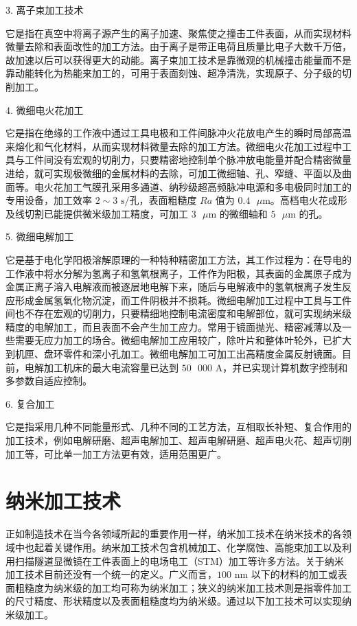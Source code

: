 \documentclass[UTF8]{ctexbook}
\newcommand{\◎}{\ensuremath{\bigcirc}}
\begin{document}
3. 离子束加工技术

它是指在真空中将离子源产生的离子加速、聚焦使之撞击工件表面，从而实现材料微量去除和表面改性的加工方法。由于离子是带正电荷且质量比电子大数千万倍，故加速以后可以获得更大的动能。离子束加工技术是靠微观的机械撞击能量而不是靠动能转化为热能来加工的，可用于表面刻蚀、超净清洗，实现原子、分子级的切削加工。

4. 微细电火花加工

它是指在绝缘的工作液中通过工具电极和工件间脉冲火花放电产生的瞬时局部高温来熔化和气化材料，从而实现材料微量去除的加工方法。微细电火花加工过程中工具与工件间没有宏观的切削力，只要精密地控制单个脉冲放电能量并配合精密微量进给，就可实现极微细的金属材料的去除，可加工微细轴、孔、窄缝、平面以及曲面等。电火花加工气膜孔采用多通道、纳秒级超高频脉冲电源和多电极同时加工的专用设备，加工效率 $2\sim3\text{ s/孔}$，表面粗糙度 $Ra$ 值为 $0.4\text{ }\mu\text{m}$。高档电火花成形及线切割已能提供微米级加工精度，可加工 $3\text{ }\mu\text{m}$ 的微细轴和 $5\text{ }\mu\text{m}$ 的孔。

5. 微细电解加工

它是基于电化学阳极溶解原理的一种特种精密加工方法，其工作过程为：在导电的工作液中将水分解为氢离子和氢氧根离子，工件作为阳极，其表面的金属原子成为金属正离子溶入电解液而被逐层地电解下来，随后与电解液中的氢氧根离子发生反应形成金属氢氧化物沉淀，而工件阴极并不损耗。微细电解加工过程中工具与工件间也不存在宏观的切削力，只要精细地控制电流密度和电解部位，就可实现纳米级精度的电解加工，而且表面不会产生加工应力。常用于镜面抛光、精密减薄以及一些需要无应力加工的场合。微细电解加工应用较广，除叶片和整体叶轮外，已扩大到机匣、盘环零件和深小孔加工。微细电解加工可加工出高精度金属反射镜面。目前，电解加工机床的最大电流容量已达到 $50\text{ }000\text{ A}$，并已实现计算机数字控制和多参数自适应控制。

6. 复合加工

它是指采用几种不同能量形式、几种不同的工艺方法，互相取长补短、复合作用的加工技术，例如电解研磨、超声电解加工、超声电解研磨、超声电火花、超声切削加工等，可比单一加工方法更有效，适用范围更广。

\section{纳米加工技术}

正如制造技术在当今各领域所起的重要作用一样，纳米加工技术在纳米技术的各领域中也起着关键作用。纳米加工技术包含机械加工、化学腐蚀、高能束加工以及利用扫描隧道显微镜在工件表面上的电场电工（STM）加工等许多方法。关于纳米加工技术目前还没有一个统一的定义。广义而言，$100\text{ nm}$ 以下的材料的加工或表面粗糙度为纳米级的加工均可称为纳米加工；狭义的纳米加工技术则是指零件加工的尺寸精度、形状精度以及表面粗糙度均为纳米级。通过以下加工技术可以实现纳米级加工。
\end{document}
